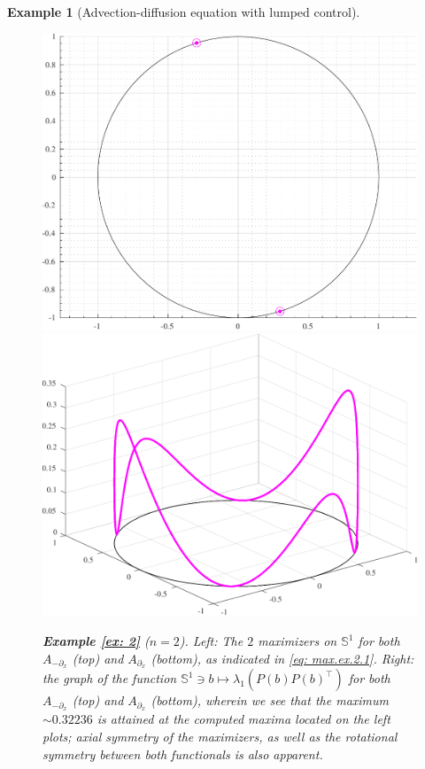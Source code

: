 \documentclass[11pt, a4paper, reqno]{amsart}
\newcommand{\del}{\partial}
\theoremstyle{plain}
\numberwithin{equation}{section}
\newtheorem{example}{Example}[section]
\begin{document}
\begin{example}[Advection-diffusion equation with lumped control]
\begin{figure}
	\includegraphics[scale=0.42]{figures/convect-+_opt}
	\hspace{0.1cm}
	\includegraphics[scale=0.42]{figures/convection_+-}
	\caption{\textbf{Example \ref{ex: 2}} ($n=2$). \emph{Left}: The $2$ maximizers on $\mathbb{S}^1$ for both $A_{-\del_x}$ (\emph{top}) and $A_{\del_x}$ (\emph{bottom}), as indicated in \eqref{eq: max.ex.2.1}. \emph{Right}: the graph of the function $\mathbb{S}^1\ni b\mapsto\lambda_1(P(b)P(b)^\top)$ for both $A_{-\del_x}$ (\emph{top}) and $A_{\del_x}$ (\emph{bottom}), wherein we see that the maximum $\sim0.32236$ is attained at the computed maxima located on the left plots; axial symmetry of the maximizers, as well as the rotational symmetry between both functionals is also apparent.}
	\label{fig: ex2.1}
	\end{figure}
	

\end{example}
\end{document}
